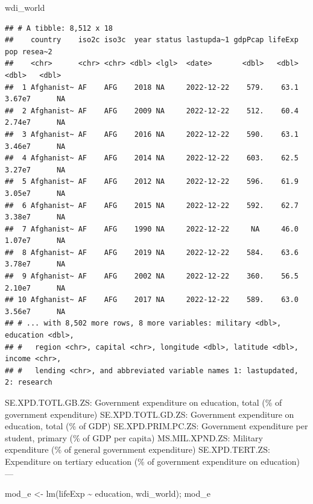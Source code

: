 \documentclass[
]{article}
\newenvironment{Shaded}{\begin{snugshade}}{\end{snugshade}}
\newcommand{\FunctionTok}[1]{\textcolor[rgb]{0.00,0.00,0.00}{#1}}
\newcommand{\NormalTok}[1]{#1}
\newcommand{\OtherTok}[1]{\textcolor[rgb]{0.56,0.35,0.01}{#1}}
\newcommand{\SpecialCharTok}[1]{\textcolor[rgb]{0.00,0.00,0.00}{#1}}
\begin{document}
\begin{Shaded}
\begin{Highlighting}[]
\NormalTok{wdi\_world}
\end{Highlighting}
\end{Shaded}

\begin{verbatim}
## # A tibble: 8,512 x 18
##    country    iso2c iso3c  year status lastupda~1 gdpPcap lifeExp    pop resea~2
##    <chr>      <chr> <chr> <dbl> <lgl>  <date>       <dbl>   <dbl>  <dbl>   <dbl>
##  1 Afghanist~ AF    AFG    2018 NA     2022-12-22    579.    63.1 3.67e7      NA
##  2 Afghanist~ AF    AFG    2009 NA     2022-12-22    512.    60.4 2.74e7      NA
##  3 Afghanist~ AF    AFG    2016 NA     2022-12-22    590.    63.1 3.46e7      NA
##  4 Afghanist~ AF    AFG    2014 NA     2022-12-22    603.    62.5 3.27e7      NA
##  5 Afghanist~ AF    AFG    2012 NA     2022-12-22    596.    61.9 3.05e7      NA
##  6 Afghanist~ AF    AFG    2015 NA     2022-12-22    592.    62.7 3.38e7      NA
##  7 Afghanist~ AF    AFG    1990 NA     2022-12-22     NA     46.0 1.07e7      NA
##  8 Afghanist~ AF    AFG    2019 NA     2022-12-22    584.    63.6 3.78e7      NA
##  9 Afghanist~ AF    AFG    2002 NA     2022-12-22    360.    56.5 2.10e7      NA
## 10 Afghanist~ AF    AFG    2017 NA     2022-12-22    589.    63.0 3.56e7      NA
## # ... with 8,502 more rows, 8 more variables: military <dbl>, education <dbl>,
## #   region <chr>, capital <chr>, longitude <dbl>, latitude <dbl>, income <chr>,
## #   lending <chr>, and abbreviated variable names 1: lastupdated, 2: research
\end{verbatim}

SE.XPD.TOTL.GB.ZS: Government expenditure on education, total (\% of
government expenditure) SE.XPD.TOTL.GD.ZS: Government expenditure on
education, total (\% of GDP) SE.XPD.PRIM.PC.ZS: Government expenditure
per student, primary (\% of GDP per capita) MS.MIL.XPND.ZS: Military
expenditure (\% of general government expenditure) SE.XPD.TERT.ZS:
Expenditure on tertiary education (\% of government expenditure on
education) ---

\begin{Shaded}
\begin{Highlighting}[]
\NormalTok{mod\_e }\OtherTok{\textless{}{-}} \FunctionTok{lm}\NormalTok{(lifeExp }\SpecialCharTok{\textasciitilde{}}\NormalTok{ education, wdi\_world); mod\_e}
\end{Highlighting}
\end{Shaded}
\end{document}
